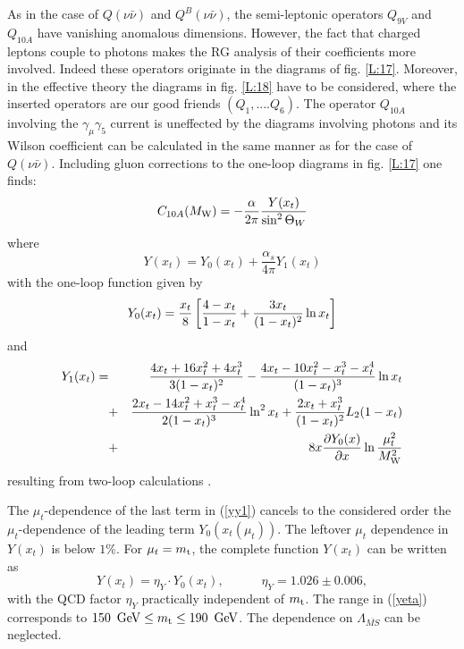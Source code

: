 \documentclass[12pt,rotate]{article}
\def\as{\alpha_s}
\newcommand{\mt}{m_{\rm t}}
\newcommand{\mw}{M_{\rm W}}
\newcommand{\gev}{\, {\rm GeV}}
\newcommand{\be}{\begin{equation}}
\newcommand{\ee}{\end{equation}}
\def\aspi{\frac{\as}{4\pi}}
\begin{document}
\begin{itemize}
\begin{itemize}
As in the case of $Q(\nu\bar\nu)$ and $Q^B(\nu\bar\nu)$, the semi-leptonic
operators $Q_{9V}$ and $Q_{10A}$ have vanishing anomalous dimensions.
However, the fact that charged leptons couple to photons makes the
RG analysis of their coefficients more involved. Indeed these operators
originate in the diagrams of fig. \ref{L:17}. 
Moreover, in the effective theory
the diagrams in fig. \ref{L:18} have to be considered, 
where the inserted operators
are our good friends $(Q_1,....Q_6)$. The operator $Q_{10A}$ involving the
$\gamma_\mu\gamma_5$ current is uneffected by the diagrams involving
photons and its Wilson coefficient can be calculated in the same manner as
for the case of $Q(\nu\bar\nu)$. Including gluon corrections to the
one-loop diagrams in fig. \ref{L:17} one finds:
\be
C_{10A}(\mw)=-\frac{\alpha}{2\pi}\frac{Y(x_t)}{\sin^2\Theta_W}
\ee
where
\begin{equation}\label{yy}
Y(x_t) = Y_0(x_t) + \aspi Y_1(x_t)\end{equation}
with the one-loop function given by \cite{IL}
\begin{equation}\label{yy0}
Y_0(x_t) = {x_t\over 8}
\left[{4-x_t\over 1-x_t}+{3x_t\over (1-x_t)^2}\ln x_t\right]
\end{equation}
and 
\begin{eqnarray}\label{yy1}
Y_1(x_t) = &&{4x_t + 16 x_t^2 + 4x_t^3 \over 3(1-x_t)^2} -
     {4x_t - 10x_t^2-x_t^3-x_t^4\over (1-x_t)^3} \ln x_t\nonumber\\
     &+&{2x_t - 14x_t^2 + x_t^3 - x_t^4\over 2(1-x_t)^3} \ln^2 x_t
           + {2x_t + x_t^3\over (1-x_t)^2} L_2(1-x_t)\nonumber\\
         &+&8x {\partial Y_0(x) \over \partial x} 
          \ln\frac{\mu_t^2}{\mw^2} 
\end{eqnarray}
resulting from two-loop calculations \cite{BB2}.
 
The $\mu_t$-dependence of the last term in (\ref{yy1}) cancels to the
considered order the $\mu_t$-dependence of the leading term 
$Y_0(x_t(\mu_t))$.
The leftover $\mu_t$ dependence in $Y(x_t)$ is below $1\%$.
For $\mu_t=\mt$, the complete function $Y(x_t)$ can  be written as
\begin{equation}\label{yeta}
Y(x_t)=\eta_Y\cdot Y_0(x_t), \qquad\quad \eta_Y=1.026\pm0.006,
\end{equation}
with the QCD factor $\eta_Y$
practically independent of $\mt$. The range in (\ref{yeta}) corresponds
to $150~\gev\le\mt\le 190~\gev$. The dependence on 
$\Lambda_{\overline{MS}}$ can be neglected.


\end{itemize}
\end{itemize}
\end{document}
